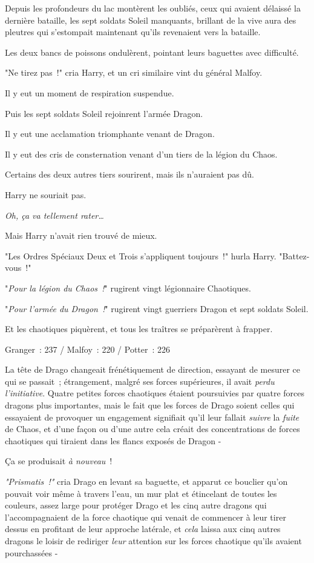 Depuis les profondeurs du lac montèrent les oubliés, ceux qui avaient délaissé la dernière bataille, les sept soldats Soleil manquants, brillant de la vive aura des pleutres qui s'estompait maintenant qu'ils revenaient vers la bataille.

Les deux bancs de poissons ondulèrent, pointant leurs baguettes avec difficulté.

"Ne tirez pas~!" cria Harry, et un cri similaire vint du général Malfoy.

Il y eut un moment de respiration suspendue.

Puis les sept soldats Soleil rejoinrent l'armée Dragon.

Il y eut une acclamation triomphante venant de Dragon.

Il y eut des cris de consternation venant d'un tiers de la légion du Chaos.

Certains des deux autres tiers sourirent, mais ils n'auraient pas dû.

Harry ne souriait pas.

\emph{Oh, ça va tellement rater…}

Mais Harry n'avait rien trouvé de mieux.

"Les Ordres Spéciaux Deux et Trois s'appliquent toujours~!" hurla Harry. "Battez-vous~!"

"\emph{Pour la légion du Chaos~!}" rugirent vingt légionnaire Chaotiques.

"\emph{Pour l'armée du Dragon~!}" rugirent vingt guerriers Dragon et sept soldats Soleil.

Et les chaotiques piquèrent, et tous les traîtres se préparèrent à frapper.

Granger~: 237 / Malfoy~: 220 / Potter~: 226

\later

La tête de Drago changeait frénétiquement de direction, essayant de mesurer ce qui se passait~; étrangement, malgré ses forces supérieures, il avait \emph{perdu l'initiative}. Quatre petites forces chaotiques étaient poursuivies par quatre forces dragons plus importantes, mais le fait que les forces de Drago soient celles qui essayaient de provoquer un engagement signifiait qu'il leur fallait \emph{suivre} la \emph{fuite} de Chaos, et d'une façon ou d'une autre cela créait des concentrations de forces chaotiques qui tiraient dans les flancs exposés de Dragon -

Ça se produisait \emph{à nouveau}~!

\emph{"Prismatis~!"} cria Drago en levant sa baguette, et apparut ce bouclier qu'on pouvait voir même à travers l'eau, un mur plat et étincelant de toutes les couleurs, assez large pour protéger Drago et les cinq autre dragons qui l'accompagnaient de la force chaotique qui venait de commencer à leur tirer dessus en profitant de leur approche latérale, et \emph{cela} laissa aux cinq autres dragons le loisir de rediriger \emph{leur} attention sur les forces chaotique qu'ils avaient pourchassées -

